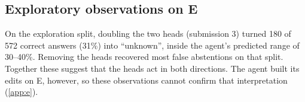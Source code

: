\subsection{Exploratory observations on E}

On the exploration split, doubling the two heads (submission 3) turned 180 of 572 correct answers (31\%) into
``unknown'', inside the agent's predicted range of 30--40\%. Removing the heads recovered most false abstentions on
that split. Together these suggest that the heads act in both directions. The agent built its edits on E, however, so
these observations cannot confirm that interpretation (\cref{app:e}).
